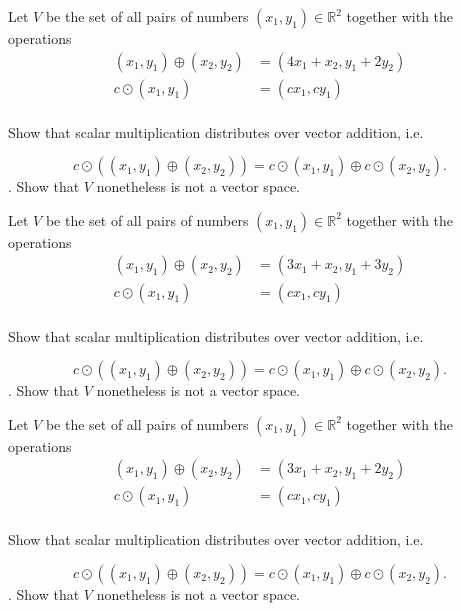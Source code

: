 \documentclass{article}
\begin{document}
\begin{exerciseStatement}
    Let \(V\) be the set of all pairs of numbers \((x_1,y_1)\in\mathbb{R}^2\)  together with the operations
\begin{align*}
(x_1,y_1)\oplus (x_2,y_2)&= (4x_1+x_2, y_1+2y_2)\\
c \odot (x_1,y_1) &= (cx_1,cy_1)\\
\end{align*}

Show that scalar multiplication distributes over vector addition, i.e.

\[c\odot \left((x_1,y_1)\oplus(x_2,y_2)\right)=c\odot(x_1,y_1)\oplus c\odot(x_2,y_2).\]
.
Show that \(V\) nonetheless is not a vector space.



  
\end{exerciseStatement}

\begin{exerciseStatement}
    Let \(V\) be the set of all pairs of numbers \((x_1,y_1)\in\mathbb{R}^2\)  together with the operations
\begin{align*}
(x_1,y_1)\oplus (x_2,y_2)&= (3x_1+x_2, y_1+3y_2)\\
c \odot (x_1,y_1) &= (cx_1,cy_1)\\
\end{align*}

Show that scalar multiplication distributes over vector addition, i.e.

\[c\odot \left((x_1,y_1)\oplus(x_2,y_2)\right)=c\odot(x_1,y_1)\oplus c\odot(x_2,y_2).\]
.
Show that \(V\) nonetheless is not a vector space.



  
\end{exerciseStatement}

\begin{exerciseStatement}
    Let \(V\) be the set of all pairs of numbers \((x_1,y_1)\in\mathbb{R}^2\)  together with the operations
\begin{align*}
(x_1,y_1)\oplus (x_2,y_2)&= (3x_1+x_2, y_1+2y_2)\\
c \odot (x_1,y_1) &= (cx_1,cy_1)\\
\end{align*}

Show that scalar multiplication distributes over vector addition, i.e.

\[c\odot \left((x_1,y_1)\oplus(x_2,y_2)\right)=c\odot(x_1,y_1)\oplus c\odot(x_2,y_2).\]
.
Show that \(V\) nonetheless is not a vector space.



  
\end{exerciseStatement}
\end{document}
